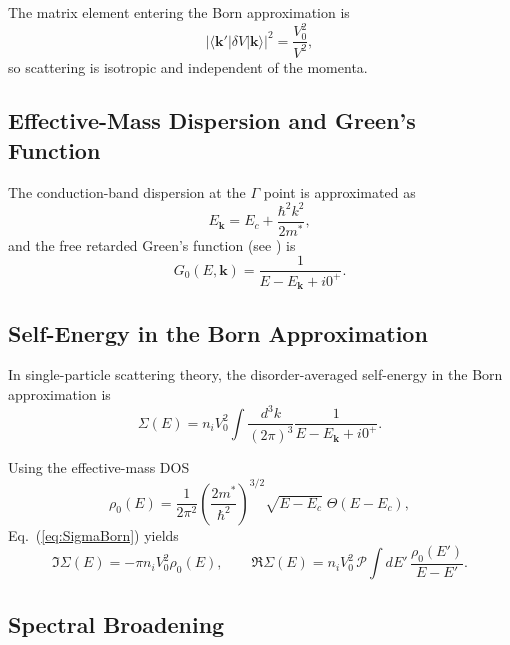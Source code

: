 The matrix element entering the Born approximation is \cite{Mahan2000}
\begin{equation}
|\langle \mathbf{k}' | \delta V | \mathbf{k} \rangle|^2 = \frac{V_0^2}{V^2},
\end{equation}
so scattering is isotropic and independent of the momenta.

\subsection{Effective-Mass Dispersion and Green's Function}

The conduction-band dispersion at the $\Gamma$ point is approximated as \cite{YuCardona2010}
\begin{equation}
E_{\mathbf{k}} = E_c + \frac{\hbar^2 k^2}{2 m^\ast},
\end{equation}
and the free retarded Green's function (see \cite{Economou2006}) is
\begin{equation}
G_0(E,\mathbf{k}) = \frac{1}{E - E_{\mathbf{k}} + i 0^+}.
\end{equation}

\subsection{Self-Energy in the Born Approximation}

In single-particle scattering theory, the disorder-averaged self-energy in the Born approximation \cite{Mahan2000,OminatoKoshino2013} is
\begin{equation}
\Sigma(E) = n_i V_0^2 
\int \frac{d^3 k}{(2\pi)^3}
\frac{1}{E - E_{\mathbf{k}} + i 0^+}.
\label{eq:SigmaBorn}
\end{equation}

Using the effective-mass DOS \cite{Kittel2005}
\begin{equation}
\rho_0(E) = 
\frac{1}{2\pi^2}
\left(\frac{2 m^\ast}{\hbar^2}\right)^{3/2}
\sqrt{E - E_c}
\;\Theta(E - E_c),
\end{equation}
Eq.~(\ref{eq:SigmaBorn}) yields \cite{Mahan2000}
\begin{equation}
\Im \Sigma(E) = -\pi n_i V_0^2 \rho_0(E),
\qquad
\Re \Sigma(E) = n_i V_0^2 
\, \mathcal{P}
\int dE'\, \frac{\rho_0(E')}{E - E'}.
\end{equation}

\subsection{Spectral Broadening}


